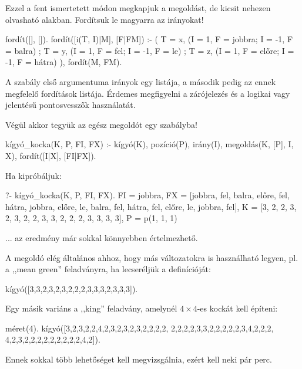 Ezzel a fent ismertetett módon megkapjuk a
megoldást, de kicsit nehezen olvasható
alakban. Fordítsuk le magyarra az irányokat!
\begin{program}
fordít([], []).
fordít([i(T, I)|M], [F|FM]) :-
    (  T = x, (I = 1, F = jobbra; I = -1, F = balra)
     ; T = y, (I = 1, F = fel;    I = -1, F = le)
     ; T = z, (I = 1, F = előre;  I = -1, F = hátra)
    ), 
    fordít(M, FM).
\end{program}
A  szabály első argumentuma irányok egy
listája, a második pedig az ennek megfelelő
fordítások listája. Érdemes megfigyelni a
zárójelezés és a logikai vagy jelentésű
pontosvesszők használatát.

Végül akkor tegyük az egész megoldót egy szabályba!
\begin{program}
kígyó_kocka(K, P, FI, FX) :-
    kígyó(K), pozíció(P), irány(I),
    megoldás(K, [P], I, X), fordít([I|X], [FI|FX]).
\end{program}

Ha kipróbáljuk:
\begin{query}
?- kígyó_kocka(K, P, FI, FX).
FI = jobbra,
FX = [jobbra, fel, balra, előre, fel, hátra, jobbra,
      előre, le, balra, fel, hátra, fel, előre, le,
      jobbra, fel],
K = [3, 2, 2, 3, 2, 3, 2, 2, 3, 3, 2, 2, 2, 3, 3, 3,
     3],
P = p(1, 1, 1)
\end{query}
... az eredmény már sokkal könnyebben értelmezhető.

A megoldó elég általános ahhoz, hogy más
változatokra is használható legyen, pl. a ,,mean
green'' feladványra, ha lecseréljük a 
definícióját:
\begin{program}
kígyó([3,3,2,3,2,3,2,2,2,3,3,3,2,3,3,3]).
\end{program}
Egy másik variáns a ,,king'' feladvány, amelynél
$4\times4$-es kockát kell építeni:
\begin{program}
méret(4).
kígyó([3,2,3,2,2,4,2,3,2,3,2,3,2,2,2,2,
       2,2,2,2,3,3,2,2,2,2,2,3,4,2,2,2,
       4,2,3,2,2,2,2,2,2,2,2,2,4,2]).
\end{program}
Ennek sokkal több lehetőséget kell megvizsgálnia,
ezért kell neki pár perc.

